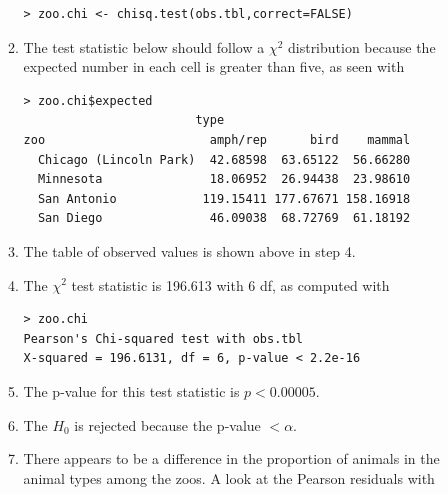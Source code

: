 \documentclass[10pt,openany]{book}\usepackage[]{graphicx}\usepackage[]{color}
\makeatletter
\newenvironment{kframe}{%
 \def\at@end@of@kframe{}%
 \ifinner\ifhmode%
  \def\at@end@of@kframe{\end{minipage}}%
  \begin{minipage}{\columnwidth}%
 \fi\fi%
 \def\FrameCommand##1{\hskip\@totalleftmargin \hskip-\fboxsep
 \colorbox{shadecolor}{##1}\hskip-\fboxsep
     \hskip-\linewidth \hskip-\@totalleftmargin \hskip\columnwidth}%
 \MakeFramed {\advance\hsize-\width
   \@totalleftmargin\z@ \linewidth\hsize
   \@setminipage}}%
 {\par\unskip\endMakeFramed%
 \at@end@of@kframe}
\newenvironment{knitrout}{}{} %
\makeatother
\begin{document}
\begin{itemize}
\begin{enumerate}
\begin{knitrout}
\color{fgcolor}\begin{kframe}
\begin{verbatim}
> zoo.chi <- chisq.test(obs.tbl,correct=FALSE)
\end{verbatim}
\end{kframe}
\end{knitrout}
      \item The test statistic below should follow a $\chi^{2}$ distribution because the expected number in each cell is greater than five, as seen with
\begin{knitrout}
\color{fgcolor}\begin{kframe}
\begin{verbatim}
> zoo.chi$expected
                        type
zoo                       amph/rep      bird    mammal
  Chicago (Lincoln Park)  42.68598  63.65122  56.66280
  Minnesota               18.06952  26.94438  23.98610
  San Antonio            119.15411 177.67671 158.16918
  San Diego               46.09038  68.72769  61.18192
\end{verbatim}
\end{kframe}
\end{knitrout}
      \item The table of observed values is shown above in step 4.
      \item The $\chi^{2}$ test statistic is 196.613 with 6 df, as computed with
\begin{knitrout}
\color{fgcolor}\begin{kframe}
\begin{verbatim}
> zoo.chi
Pearson's Chi-squared test with obs.tbl 
X-squared = 196.6131, df = 6, p-value < 2.2e-16
\end{verbatim}
\end{kframe}
\end{knitrout}
      \item The p-value for this test statistic is $p<0.00005$.
      \item The $H_{0}$ is rejected because the p-value $<\alpha$.
      \item There appears to be a difference in the proportion of animals in the animal types among the zoos.  A look at the Pearson residuals with
\begin{knitrout}
\color{fgcolor}\begin{kframe}

\end{kframe}
\end{knitrout}
\end{enumerate}
\end{itemize}
\end{document}
